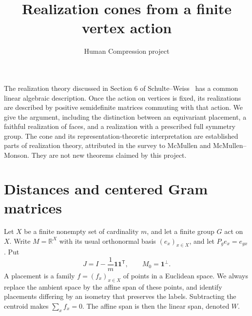 \documentclass[11pt,a4paper]{article}
\title{Realization cones from a finite vertex action}
\author{Human Compression project}\date{}
\newcommand{\R}{\mathbb R}
\newcommand{\one}{\mathbf 1}
\begin{document}
\maketitle

The realization theory discussed in Section 6 of Schulte--Weiss~\cite{survey}
has a common linear algebraic description. Once the action on vertices is
fixed, its realizations are described by positive semidefinite matrices
commuting with that action. We give the argument, including the distinction
between an equivariant placement, a faithful realization of faces, and a
realization with a prescribed full symmetry group. The cone and its
representation-theoretic interpretation are established parts of realization
theory, attributed in the survey to McMullen and McMullen--Monson. They are
not new theorems claimed by this project.

\section{Distances and centered Gram matrices}
Let $X$ be a finite nonempty set of cardinality $m$, and let a finite group $G$ act on $X$.
Write $M=\R^X$ with its usual orthonormal basis $(e_x)_{x\in X}$, and let
$P_g e_x=e_{gx}$. Put
\[
 J=I-\frac1m\one\one^{\mathsf T},\qquad
 M_0=\one^\perp.
\]
A placement is a family $f=(f_x)_{x\in X}$ of points in a Euclidean space.
We always replace the ambient space by the affine span of these points,
and identify placements differing by an isometry that preserves the labels.
Subtracting the centroid makes $\sum_x f_x=0$. The affine span is then the
linear span, denoted $W$.
\end{document}
